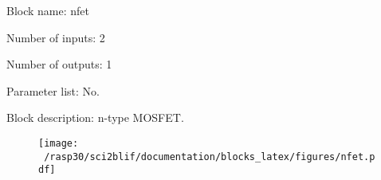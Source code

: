 \pagebreak
Block name: nfet

Number of inputs: 2

Number of outputs: 1

Parameter list: No.

Block description: 
n-type MOSFET.

\begin{figure}[H]  %
\texttt{[image: ~/rasp30/sci2blif/documentation/blocks\_latex/figures/nfet.pdf]}
\end{figure}

